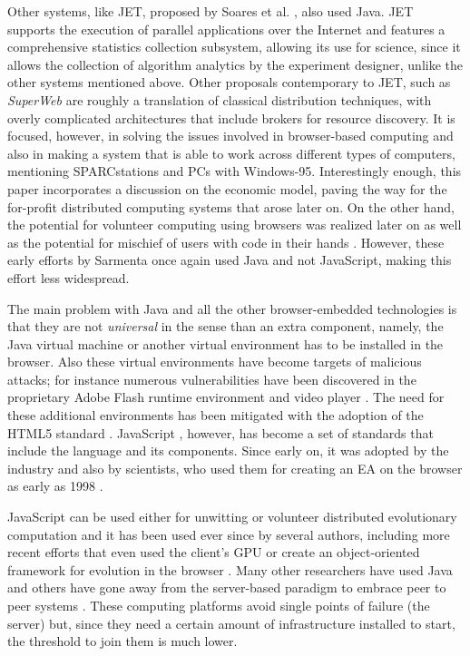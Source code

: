 \documentclass[journal,onecolumn]{IEEEtran}
\begin{document}
Other systems, like JET, proposed by Soares et
al. \cite{soares1998get}, also used Java. JET supports
the execution of parallel applications over the Internet and features
a comprehensive statistics collection subsystem, allowing its use for science,
since it allows the collection of algorithm analytics by the
experiment designer, unlike the other systems mentioned
above. Other proposals contemporary to JET, such as {\em SuperWeb}
\cite{alexandrov1997superweb} are roughly a translation of classical
distribution techniques, with overly complicated architectures that include
brokers for resource discovery. It is focused, however, in solving the
issues involved in browser-based computing and also in making a system
that is able to work across different types of computers, mentioning
SPARCstations and PCs with Windows-95. Interestingly enough, this
paper incorporates a discussion on the economic model, paving the way
for the for-profit distributed computing systems that arose later on. 
On the other hand, the potential for volunteer computing using
browsers was realized
later on \cite{sarmenta-bayanihan} as well as the potential for
mischief of users with code in their hands
\cite{sarmenta-sabotagetolerance}. However, these early efforts by
Sarmenta once again used Java and not JavaScript, making this effort
less widespread.

The main problem with Java and all the other browser-embedded
technologies is that they are not {\em universal} in the
sense than an extra component, namely, the Java virtual machine or another
virtual environment has to be installed in the browser.
Also these virtual environments have become targets of malicious attacks; 
for instance numerous vulnerabilities have been discovered in 
the proprietary Adobe Flash runtime environment and
video player \cite{ford2009analyzing,watanabe2010new}. The need for
these additional environments has been mitigated with the
adoption of the HTML5 standard \cite{anthes2012html5}.
JavaScript \cite{flanagan2006javascript}, however, has become a set of standards
\cite{ECMA-262} that include the language and its components. Since
early on, it was adopted by the industry and also by scientists,
who used them for creating an EA on
the browser as early as 1998 \cite{jj-ppsn98}.

JavaScript can be used either for unwitting
\cite{unwitting-ec} or volunteer
\cite{langdon:2005:metas,gecco07:workshop:dcor} distributed
evolutionary computation and it has been used ever since by several
authors, including more recent efforts
\cite{Desell:2008:AHG:1389095.1389273,duda2013distributed,DBLP:journals/corr/abs-0801-1210} 
that even
used the client's GPU \cite{duda2013gpu} or create an object-oriented
framework for evolution in the browser \cite{EvoStar2014:jsEO}. Many other researchers have
used Java \cite{chong:1999:jDGPi} and others have gone away from the
server-based paradigm to embrace peer to peer systems
\cite{jin2006constructing,10.1109/ICICSE.2008.99,DBLP:conf/3pgcic/GuervosMFEL12}. These computing
platforms avoid single points of failure (the server) but, since they
need a certain amount of infrastructure installed to start, the
threshold to join them is much lower.
\end{document}
